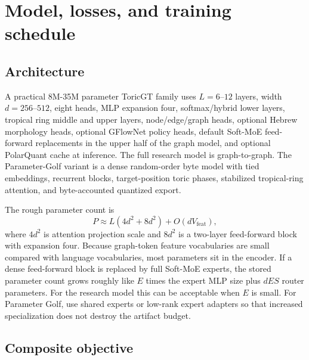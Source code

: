 \documentclass[11pt]{article}
\theoremstyle{definition}
\theoremstyle{plain}
\theoremstyle{remark}
\numberwithin{equation}{section}
\begin{document}
\section{Model, losses, and training schedule}

\subsection{Architecture}

A practical 8M-35M parameter ToricGT family uses $L=6$--$12$ layers, width $d=256$--$512$, eight heads, MLP expansion four, softmax/hybrid lower layers, tropical ring middle and upper layers, node/edge/graph heads, optional Hebrew morphology heads, optional GFlowNet policy heads, default Soft-MoE feed-forward replacements in the upper half of the graph model, and optional PolarQuant cache at inference.  The full research model is graph-to-graph.  The Parameter-Golf variant is a dense random-order byte model with tied embeddings, recurrent blocks, target-position toric phases, stabilized tropical-ring attention, and byte-accounted quantized export.

The rough parameter count is
\begin{equation}
  P\approx L\left(4d^2+8d^2\right)+O(dV_{\mathrm{feat}}),
\end{equation}
where $4d^2$ is attention projection scale and $8d^2$ is a two-layer feed-forward block with expansion four.  Because graph-token feature vocabularies are small compared with language vocabularies, most parameters sit in the encoder.  If a dense feed-forward block is replaced by full Soft-MoE experts, the stored parameter count grows roughly like $E$ times the expert MLP size plus $dES$ router parameters.  For the research model this can be acceptable when $E$ is small.  For Parameter Golf, use shared experts or low-rank expert adapters so that increased specialization does not destroy the artifact budget.

\subsection{Composite objective}
\end{document}
